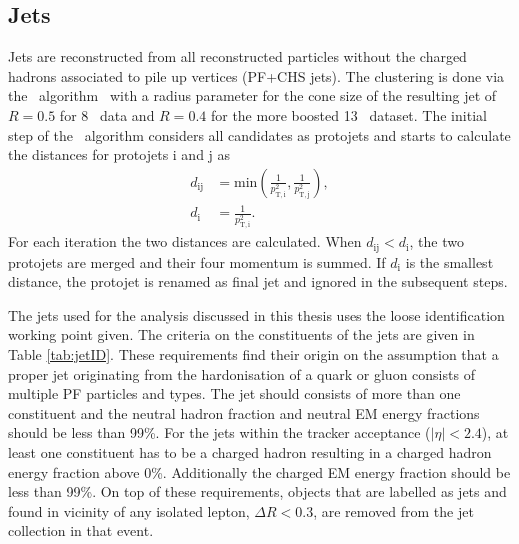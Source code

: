\subsection{Jets}
Jets are reconstructed  from all reconstructed particles without the charged hadrons associated to pile up vertices (PF+CHS jets). The clustering is done via the \antikt\ algorithm~\cite{Cacciari:2008gp} with a radius parameter for the cone size of the resulting jet of $R=0.5$ for 8 \TeV\ data and $R=0.4$ for the more boosted 13 \TeV\ dataset. The initial step of the \antikt\ algorithm considers all candidates as protojets and starts to calculate the distances for protojets i and j as
\begin{equation}
\begin{aligned}
   d_{\mathrm{ij}} &= \mathrm{min}\left(\frac{1}{p_{\mathrm{T,i}}^2}, \frac{1}{p_{\mathrm{T,j}}^2}\right), \\
   d_{\mathrm{i}} &= \frac{1}{p_{\mathrm{T,i}}^2}.
 \end{aligned}
\end{equation}
For each iteration the two distances are calculated. When $d_{\mathrm{ij}} < d_{\mathrm{i}}$, the two protojets are merged and their four momentum is summed. If $d_{\mathrm{i}}$ is the smallest distance, the protojet is renamed as final jet and ignored in the subsequent steps. 

The jets used for the analysis discussed in this thesis uses the loose identification working point given. The criteria on the constituents of the jets are given in Table \ref{tab:jetID}. These requirements find their origin on the assumption that a proper jet originating from the hardonisation of a quark or gluon consists of multiple PF particles and types. The jet should consists of more than one constituent and the neutral hadron fraction and neutral EM energy fractions should be less than 99\%. For the jets within the tracker acceptance ($|\eta|<2.4$), at least one constituent has to be a charged hadron resulting in a charged hadron energy fraction above 0\%. Additionally the charged EM energy fraction should be less than 99\%. On top of these requirements, objects that are labelled as jets and found in vicinity of any isolated lepton, $\Delta R < 0.3$, are removed from the jet collection in that event. 

